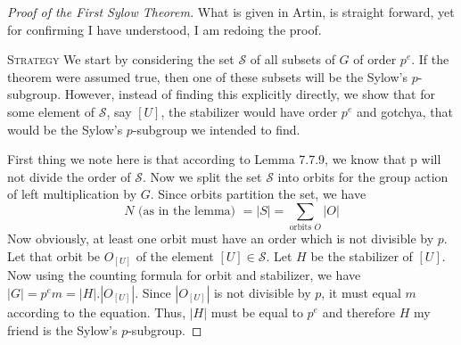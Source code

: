 \documentclass[12pt]{article}
\begin{document}
\begin{proof}[Proof of the First Sylow Theorem]
What is given in Artin, is straight forward, yet for confirming I have understood, I am redoing the proof.
\par
\textsc {Strategy } We start by considering the set $\mathcal S$ of all subsets of $G$ of order $p^{e}$. If the theorem were assumed true, then one of these subsets will be the Sylow's $p$-subgroup. However, instead of finding this explicitly directly, we show that for some element of $\mathcal S$, say $[U]$, the stabilizer would have order $p^{e}$ and gotchya, that would be the Sylow's $p$-subgroup we intended to find.
\par
First thing we note here is that according to Lemma 7.7.9, we know that p will not divide the order of $\mathcal S$. Now we split the set $\mathcal S$ into orbits for the group action of left multiplication by $G$. Since orbits partition the set, we have
\begin{equation*}
N \text{ (as in the lemma) } = |S| = \sum\limits_{\text{orbits } O} |O|
\end{equation*}
Now obviously, at least one orbit must have an order which is not divisible by $p$. Let that orbit be $O_{[U]}$ of the element $[U] \in \mathcal S$. Let $H$ be the stabilizer of $[U]$. Now using the counting formula for orbit and stabilizer, we have $|G|=p^{e}m=|H|.|O_{[U]}|$. Since $|O_{[U]}|$ is not divisible by $p$, it must equal $m$ according to the equation. Thus, $|H|$ must be equal to $p^{e}$ and therefore $H$ my friend is the Sylow's $p$-subgroup.
\end{proof}
\end{document}
